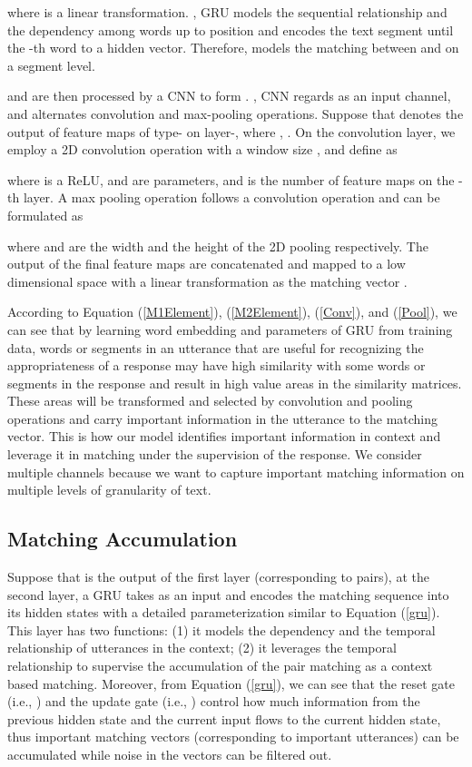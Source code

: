 \documentclass[11pt,a4paper]{article}
\begin{document}
	where  is a linear transformation. , GRU models the sequential relationship and the dependency among words up to position  and encodes the text segment until the -th word to a hidden vector. Therefore,  models the matching between  and  on a segment level.    
	
	 and  are then processed by a CNN to form . , CNN regards  as an input channel, and alternates convolution and max-pooling operations. Suppose that  denotes the output of feature maps of type- on layer-, where , . On the convolution layer, we employ a 2D convolution operation with a window size , and define  as
	
	where  is a ReLU,  and  are parameters, and  is the number of feature maps on the -th layer. A max pooling operation follows a convolution operation and can be formulated as 
	
	where  and  are the width and the height of the 2D pooling respectively. The output of the final feature maps are concatenated and mapped to a low dimensional space with a linear transformation as the matching vector .
	
	According to Equation (\ref{M1Element}), (\ref{M2Element}), (\ref{Conv}), and (\ref{Pool}), we can see that by learning word embedding and parameters of GRU from training data, words or segments in an utterance that are useful for recognizing the appropriateness of a response may have high similarity with some words or segments in the response and result in high value areas in the similarity matrices. These areas will be transformed and selected by convolution and pooling operations and carry important information in the utterance to the matching vector. This is how our model identifies important information in context and leverage it in matching under the supervision of the response. We consider multiple channels because we want to capture important matching information on multiple levels of granularity of text.    
	
	\subsection{Matching Accumulation}\label{match_acum}
	Suppose that  is the output of the first layer (corresponding to  pairs), at the second layer, a GRU takes  as an input and encodes the matching sequence into its hidden states  with a detailed parameterization similar to Equation (\ref{gru}). This layer has two functions: (1) it models  the dependency and the temporal relationship of utterances in the context; (2) it leverages the temporal relationship to supervise the accumulation of the pair matching as a context based matching.  Moreover, from Equation (\ref{gru}), we can see that the reset gate (i.e., ) and the update gate (i.e., ) control how much information from the previous hidden state and the current input flows to the current hidden state, thus important matching vectors (corresponding to important utterances) can be accumulated while noise in the vectors can be filtered out. 
	
\end{document}
